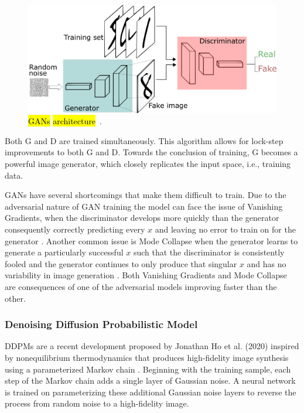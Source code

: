 \documentclass[technologies,article,accept,pdftex,moreauthors]{Definitions/mdpi}
\begin{document}
\begin{figure}[H]
    \includegraphics[width=\columnwidth]{GANs.png}
    \caption{\hl{GANs} %
 \hl{architecture}~\cite{Yan2021}.\label{fig:GAN}}
\end{figure}



Both G and D are trained simultaneously. This algorithm allows for lock-step improvements to both G and D. Towards the conclusion of training, G becomes a powerful image generator, which closely replicates the input space, i.e., training data.


GANs have several shortcomings that make them difficult to train. Due to the adversarial nature of GAN training the model can face the issue of Vanishing Gradients, when the discriminator develops more quickly than the generator consequently correctly predicting every $x$ and leaving no error to train on for the generator \cite{google}. Another common issue is Mode Collapse when the generator learns to generate a particularly successful $x$ such that the discriminator is consistently fooled and the generator continues to only produce that singular $x$ and has no variability in image generation \cite{google}. Both Vanishing Gradients and Mode Collapse are consequences of one of the adversarial models improving faster than the other.


\subsubsection{Denoising Diffusion Probabilistic Model}

DDPMs are a recent development proposed by Jonathan Ho et al. (2020) inspired by nonequilibrium thermodynamics that produces high-fidelity image synthesis using a parameterized Markov chain \cite{ho2020denoising}. Beginning with the training sample, each step of the Markov chain adds a single layer of Gaussian noise. A neural network is trained on parameterizing these additional Gaussian noise layers to reverse the process from random noise to a high-fidelity image.
\end{document}
